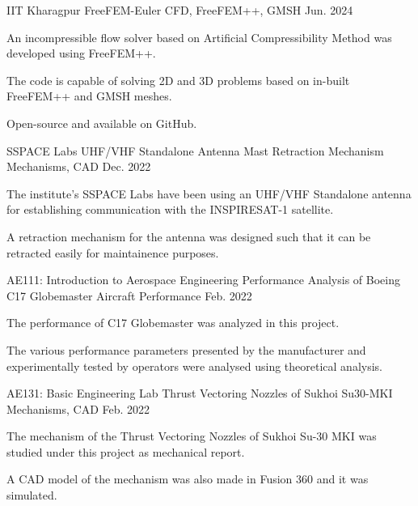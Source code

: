 \begin{cventries}
  \cventry
  {IIT Kharagpur} %
  {FreeFEM-Euler} %
  {CFD, FreeFEM++, GMSH} %
  {Jun. 2024} %
  {
    \begin{cvitems} %
      \item {An incompressible flow solver based on Artificial Compressibility Method was developed using FreeFEM++.}
      \item {The code is capable of solving 2D and 3D problems based on in-built FreeFEM++ and GMSH meshes.}
      \item {Open-source and available on GitHub.}
    \end{cvitems}
  }
  
  \cventry
  {SSPACE Labs} %
  {UHF/VHF Standalone Antenna Mast Retraction Mechanism} %
  {Mechanisms, CAD} %
  {Dec. 2022} %
  {
    \begin{cvitems} %
      \item {The institute's SSPACE Labs have been using an UHF/VHF Standalone antenna for establishing communication with the INSPIRESAT-1 satellite.}
      \item {A retraction mechanism for the antenna was designed such that it can be retracted easily for maintainence purposes.}
    \end{cvitems}
  }

  \cventry
  {AE111: Introduction to Aerospace Engineering} %
  {Performance Analysis of Boeing C17 Globemaster} %
  {Aircraft Performance} %
  {Feb. 2022} %
  {
    \begin{cvitems} %
      \item {The performance of C17 Globemaster was analyzed in this project.}
      \item {The various performance parameters presented by the manufacturer and experimentally tested by operators were analysed using theoretical analysis.}
    \end{cvitems}
  }

  \cventry
  {AE131: Basic Engineering Lab} %
  {Thrust Vectoring Nozzles of Sukhoi Su30-MKI} %
  {Mechanisms, CAD} %
  {Feb. 2022} %
  {
    \begin{cvitems} %
      \item {The mechanism of the Thrust Vectoring Nozzles of Sukhoi Su-30 MKI was studied under this project as mechanical report.}
      \item { A CAD model of the mechanism was also made in Fusion 360 and it was simulated.}
    \end{cvitems}
  }
\end{cventries}
